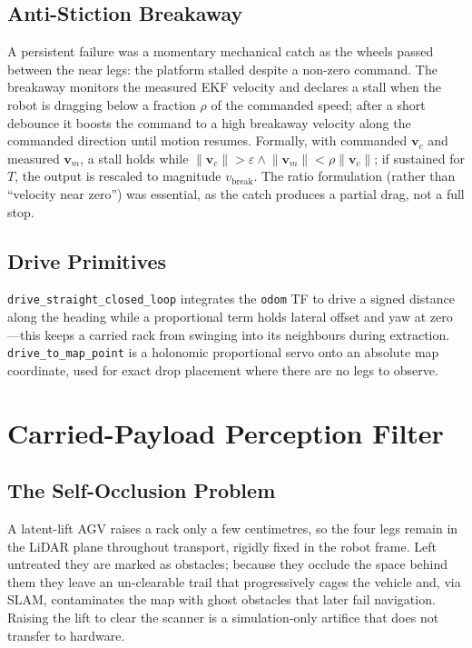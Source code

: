 \documentclass[11pt,a4paper]{article}
\newcommand{\code}[1]{\texttt{\small #1}}
\begin{document}
\subsection{Anti-Stiction Breakaway}
A persistent failure was a momentary mechanical catch as the wheels passed
between the near legs: the platform stalled despite a non-zero command. The
breakaway monitors the measured EKF velocity and declares a stall when the
robot is dragging below a fraction $\rho$ of the commanded speed; after a
short debounce it boosts the command to a high breakaway velocity along the
commanded direction until motion resumes. Formally, with commanded
$\mathbf v_c$ and measured $\mathbf v_m$, a stall holds while
$\lVert\mathbf v_c\rVert>\varepsilon \wedge \lVert\mathbf v_m\rVert<\rho\lVert\mathbf v_c\rVert$;
if sustained for $T$, the output is rescaled to magnitude $v_\text{break}$.
The ratio formulation (rather than ``velocity near zero'') was essential, as
the catch produces a partial drag, not a full stop.

\subsection{Drive Primitives}
\code{drive\_straight\_closed\_loop} integrates the \code{odom} TF to drive a
signed distance along the heading while a proportional term holds lateral
offset and yaw at zero---this keeps a carried rack from swinging into its
neighbours during extraction. \code{drive\_to\_map\_point} is a holonomic
proportional servo onto an absolute map coordinate, used for exact drop
placement where there are no legs to observe.

\section{Carried-Payload Perception Filter}\label{sec:filter}
\subsection{The Self-Occlusion Problem}
A latent-lift AGV raises a rack only a few centimetres, so the four legs
remain in the LiDAR plane throughout transport, rigidly fixed in the robot
frame. Left untreated they are marked as obstacles; because they occlude the
space behind them they leave an un-clearable trail that progressively cages
the vehicle and, via SLAM, contaminates the map with ghost obstacles that
later fail navigation. Raising the lift to clear the scanner is a
simulation-only artifice that does not transfer to hardware.
\end{document}

